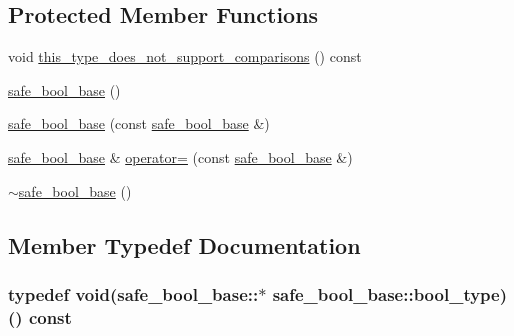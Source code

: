 \subsection*{Protected Member Functions}
\begin{DoxyCompactItemize}
\item 
void \hyperlink{classsafe__bool__base_a9f4f5af56623fb8402ec3166271fbb83}{this\-\_\-type\-\_\-does\-\_\-not\-\_\-support\-\_\-comparisons} () const 
\item 
\hyperlink{classsafe__bool__base_ad22b28fee23e9d0e53517d772f7cc44b}{safe\-\_\-bool\-\_\-base} ()
\item 
\hyperlink{classsafe__bool__base_a6433d7d48121125d2e6e327458370b16}{safe\-\_\-bool\-\_\-base} (const \hyperlink{classsafe__bool__base}{safe\-\_\-bool\-\_\-base} \&)
\item 
\hyperlink{classsafe__bool__base}{safe\-\_\-bool\-\_\-base} \& \hyperlink{classsafe__bool__base_a8d4ba45218be3b334dc5fb8738a0e820}{operator=} (const \hyperlink{classsafe__bool__base}{safe\-\_\-bool\-\_\-base} \&)
\item 
\hyperlink{classsafe__bool__base_a238d9d80b00be22aa2866faadb6dc239}{$\sim$safe\-\_\-bool\-\_\-base} ()
\end{DoxyCompactItemize}


\subsection{Member Typedef Documentation}
\hypertarget{classsafe__bool__base_aae4e1a73eb4c4d1a43611bf32985e961}{
\subsubsection[{bool\-\_\-type}]{\setlength{\rightskip}{0pt plus 5cm}typedef void(safe\-\_\-bool\-\_\-base\-::$\ast$ safe\-\_\-bool\-\_\-base\-::bool\-\_\-type)() const \hspace{0.3cm}{\ttfamily [protected]}}}\label{classsafe__bool__base_aae4e1a73eb4c4d1a43611bf32985e961}


